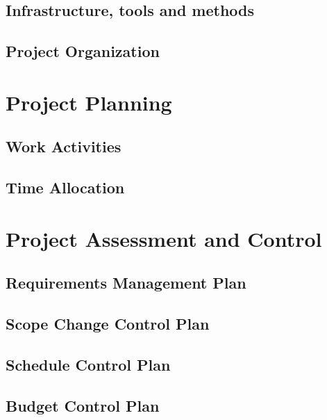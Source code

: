 \documentclass[a4paper, 10pt, oneside]{book}
\begin{document}
\section{Infrastructure, tools and methods} \label{sec:infrastructure-tools-and-methods}
\lipsum[1]

\section{Project Organization} \label{sec:project-organization}
\lipsum[1]

\chapter{Project Planning} \label{cpt:project-planning}
\lipsum[1]

\section{Work Activities} \label{sec:work-activities}
\lipsum[1]

\section{Time Allocation} \label{sec:time-allocation}
\lipsum[1]

\chapter{Project Assessment and Control} \label{cpt:project-assessment-and-control}
\lipsum[1]

\section{Requirements Management Plan}
\lipsum[1]

\section{Scope Change Control Plan}
\lipsum[1]

\section{Schedule Control Plan}
\lipsum[1]

\section{Budget Control Plan}
\lipsum[1]
\end{document}
